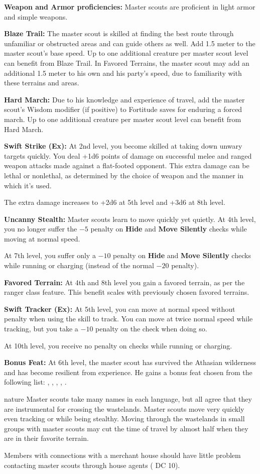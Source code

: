 {
\textbf{Weapon and Armor proficiencies:} Master scouts are proficient in light armor and simple weapons.

\textbf{Blaze Trail:} The master scout is skilled at finding the best route through unfamiliar or obstructed areas and can guide others as well. Add 1.5 meter to the master scout's base speed. Up to one additional creature per master scout level can benefit from Blaze Trail. In Favored Terrains, the master scout may add an additional 1.5 meter to his own and his party's speed, due to familiarity with these terrains and areas.

\textbf{Hard March:} Due to his knowledge and experience of travel, add the master scout's Wisdom modifier (if positive) to Fortitude saves for enduring a forced march. Up to one additional creature per master scout level can benefit from Hard March.

\textbf{Swift Strike (Ex):} At 2nd level, you become skilled at taking down unwary targets quickly. You deal +1d6 points of damage on successful melee and ranged weapon attacks made against a flat-footed opponent. This extra damage can be lethal or nonlethal, as determined by the choice of weapon and the manner in which it's used.

The extra damage increases to +2d6 at 5th level and +3d6 at 8th level.

\textbf{Uncanny Stealth:} Master scouts learn to move quickly yet quietly. At 4th level, you no longer suffer the $-5$ penalty on \textbf{Hide} and \textbf{Move Silently} checks while moving at normal speed.

At 7th level, you suffer only a $-10$ penalty on \textbf{Hide} and \textbf{Move Silently} checks while running or charging (instead of the normal $-20$ penalty).

\textbf{Favored Terrain:} At 4th and 8th level you gain a favored terrain, as per the ranger class feature. This benefit scales with previously chosen favored terrains.

\textbf{Swift Tracker (Ex):} At 5th level, you can move at normal speed without penalty when using the  skill to track. You can move at twice normal speed while tracking, but you take a $-10$ penalty on the check when doing so.

At 10th level, you receive no penalty on  checks while running or charging.

\textbf{Bonus Feat:} At 6th level, the master scout has survived the Athasian wilderness and has become resilient from experience. He gains a bonus feat chosen from the following list: , , , , .
}
{}
{nature}
{Master scouts take many names in each language, but all agree that they are instrumental for crossing the wastelands.}
{Master scouts move very quickly even tracking or while being stealthy.}
{Moving through the wastelands in small groups with master scouts may cut the time of travel by almost half when they are in their favorite terrain.}

Members with connections with a merchant house should have little problem contacting master scouts through house agents ( DC 10).